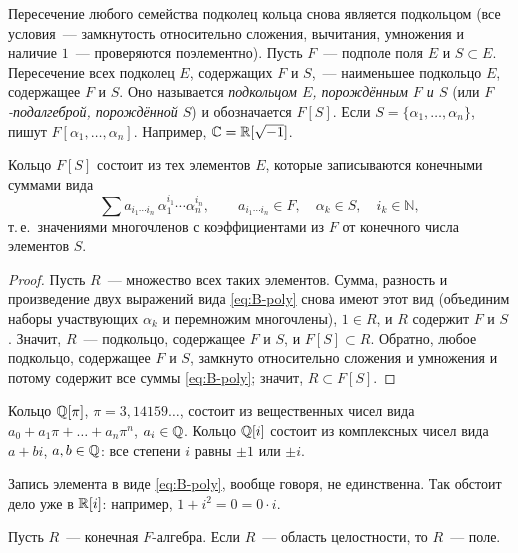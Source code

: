 Пересечение любого семейства подколец кольца снова является подкольцом (все условия~--- замкнутость относительно сложения,
вычитания, умножения и наличие $1$~--- проверяются поэлементно). Пусть $F$~--- подполе поля $E$ и $S\subset E$.
Пересечение всех подколец $E$, содержащих $F$ и $S$,~--- наименьшее подкольцо $E$, содержащее $F$ и $S$. Оно называется
\emph{подкольцом $E$, порождённым $F$ и $S$} (или \emph{$F$-подалгеброй, порождённой $S$}) и обозначается $F[S]$. Если
$S=\{\alpha_1,\dots,\alpha_n\}$, пишут $F[\alpha_1,\dots,\alpha_n]$. Например, $\mathbb C=\mathbb R[\sqrt{-1}]$.

\begin{lemma}[1.21]
Кольцо $F[S]$ состоит из тех элементов $E$, которые записываются конечными суммами вида
\begin{equation}\label{eq:B-poly}
\sum a_{i_1\cdots i_n}\,\alpha_1^{i_1}\cdots\alpha_n^{i_n},\qquad a_{i_1\cdots i_n}\in F,\quad \alpha_k\in S,\quad i_k\in\mathbb N,
\end{equation}
т.\,е.\ значениями многочленов с коэффициентами из $F$ от конечного числа элементов $S$.
\end{lemma}

\begin{proof}
Пусть $R$~--- множество всех таких элементов. Сумма, разность и произведение двух выражений вида \eqref{eq:B-poly}
снова имеют этот вид (объединим наборы участвующих $\alpha_k$ и перемножим многочлены), $1\in R$, и $R$ содержит $F$ и
$S$. Значит, $R$~--- подкольцо, содержащее $F$ и $S$, и $F[S]\subset R$. Обратно, любое подкольцо, содержащее $F$ и $S$,
замкнуто относительно сложения и умножения и потому содержит все суммы \eqref{eq:B-poly}; значит, $R\subset F[S]$.
\end{proof}

\begin{example}[1.22]
Кольцо $\mathbb Q[\pi]$, $\pi=3{,}14159\ldots$, состоит из вещественных чисел вида $a_0+a_1\pi+\dots+a_n\pi^n$, $a_i\in\mathbb Q$.
Кольцо $\mathbb Q[i]$ состоит из комплексных чисел вида $a+bi$, $a,b\in\mathbb Q$: все степени $i$ равны $\pm1$ или $\pm i$.
\end{example}

Запись элемента в виде \eqref{eq:B-poly}, вообще говоря, не единственна. Так обстоит дело уже в $\mathbb R[i]$: например,
$1+i^2=0=0\cdot i$.

\begin{lemma}[1.23]
Пусть $R$~--- конечная $F$-алгебра. Если $R$~--- область целостности, то $R$~--- поле.
\end{lemma}

